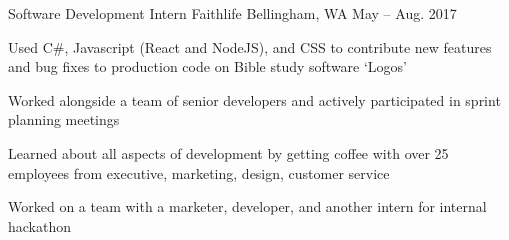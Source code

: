 

\begin{cventries}

  \cventry
    {Software Development Intern} %
    {Faithlife} %
    {Bellingham, WA} %
    {May – Aug. 2017} %
    {
      \begin{cvitems} %
        \item {Used C\#, Javascript (React and NodeJS), and CSS to contribute new features and bug fixes to production code on Bible study software `Logos'}
        \item {Worked alongside a team of senior developers and actively participated in sprint planning meetings}
        \item {Learned about all aspects of development by getting coffee with over 25 employees from executive, marketing, design, customer service}
        \item {Worked on a team with a marketer, developer, and another intern for internal hackathon}
      \end{cvitems}
    }

\end{cventries}
